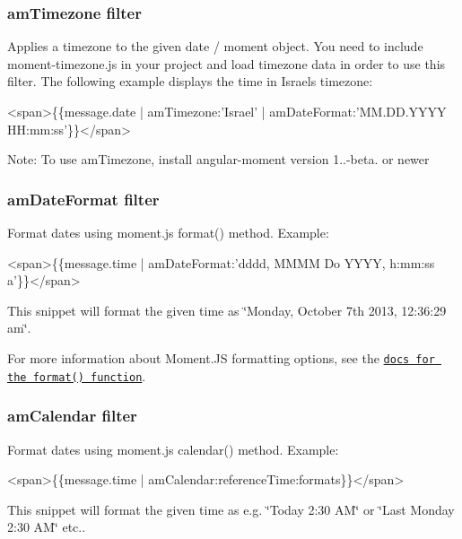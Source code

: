 \subsubsection*{am\+Timezone filter}

Applies a timezone to the given date / moment object. You need to include {\ttfamily moment-\/timezone.\+js} in your project and load timezone data in order to use this filter. The following example displays the time in Israel\textquotesingle{}s timezone\+:


\begin{DoxyCode}
<span>\{\{message.date | amTimezone:'Israel' | amDateFormat:'MM.DD.YYYY HH:mm:ss'\}\}</span>
\end{DoxyCode}


Note\+: To use {\ttfamily am\+Timezone}, install angular-\/moment version 1..-\/beta. or newer

\subsubsection*{am\+Date\+Format filter}

Format dates using moment.\+js format() method. Example\+:


\begin{DoxyCode}
<span>\{\{message.time | amDateFormat:'dddd, MMMM Do YYYY, h:mm:ss a'\}\}</span>
\end{DoxyCode}


This snippet will format the given time as \char`\"{}\+Monday, October 7th 2013, 12\+:36\+:29 am\char`\"{}.

For more information about Moment.\+JS formatting options, see the \href{http://momentjs.com/docs/#/displaying/format/}{\tt docs for the format() function}.

\subsubsection*{am\+Calendar filter}

Format dates using moment.\+js calendar() method. Example\+:


\begin{DoxyCode}
<span>\{\{message.time | amCalendar:referenceTime:formats\}\}</span>
\end{DoxyCode}


This snippet will format the given time as e.\+g. \char`\"{}\+Today 2\+:30 A\+M\char`\"{} or \char`\"{}\+Last Monday 2\+:30 A\+M\char`\"{} etc..

